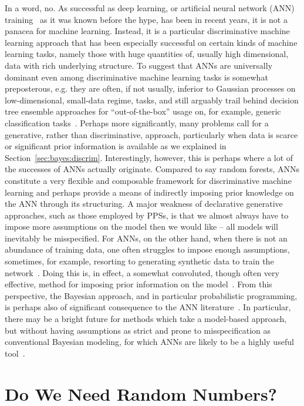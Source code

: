 In a word, no.  As successful as deep learning, or artificial neural network (ANN) training~\citep{bishop1995neural} 
as it was known before the hype,
has been in recent years, it is not a panacea for machine learning.  Instead, it is a particular discriminative
machine learning approach that has been especially successful on certain kinds of machine learning tasks,
namely those with huge quantities of, usually high dimensional, data with rich underlying structure.   
To suggest that ANNs are universally dominant even among discriminative machine learning tasks is
somewhat preposterous, e.g. they are often, if not usually, inferior to Gaussian processes on low-dimensional,
small-data regime, tasks, and still arguably trail behind decision tree ensemble approaches for ``out-of-the-box''
usage on, for example, generic classification tasks~\citep{rainforth2015canonical}.   Perhaps more significantly,
many problems call for a generative, rather than discriminative, approach,
particularly when data is scarce or significant prior information is available as we explained
in Section~\ref{sec:bayes:discrim}.  Interestingly, however, this is perhaps
where a lot of the successes of ANNs actually originate.  Compared to say random forests, ANNs constitute a very
flexible and composable framework for discriminative machine learning and perhaps provide a means of 
indirectly imposing prior knowledge on the ANN through its structuring.  A major weakness of
declarative generative approaches, such as those employed by PPSs, is that we almost
always have to impose more assumptions on the model then we would like -- all models will inevitably be
misspecified.  For ANNs, on the other hand, when there is not an abundance of training data,
one often struggles to impose enough assumptions, sometimes,
for example, resorting to generating synthetic data to train the network~\citep{von2008recaptcha}.  
Doing this is, in effect, a somewhat convoluted,
though often very effective, method for imposing prior information on the model~\citep{le2017using}.  From this
perspective, the Bayesian approach, and in particular probabilistic programming, is perhaps also of significant
consequence to the ANN literature~\citep{gal2016uncertainty}.
In particular, there may be a bright future for methods which
take a model-based approach, but without having assumptions as strict and prone to misspecification
as conventional Bayesian modeling, for which ANNs are likely to be a highly useful tool~\citep{siddharth2017learning}.

\section{Do We Need Random Numbers?}

